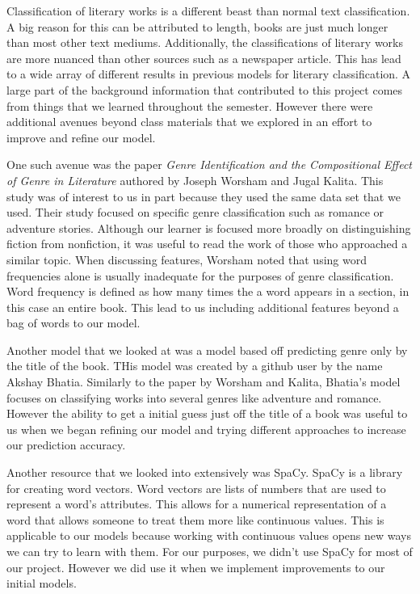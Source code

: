 \documentclass{article}
\begin{document}
Classification of literary works is a different beast than normal text classification. A big reason for this can be attributed to length, books are just much longer than most other text mediums. Additionally, the classifications of literary works are more nuanced than other sources such as a newspaper article. This has lead to a wide array of different results in previous models for literary classification. A large part of the background information that contributed to this project comes from things that we learned throughout the semester. However there were additional avenues beyond class materials that we explored in an effort to improve and refine our model. \par
One such avenue was the paper \textit{Genre Identification and the Compositional Effect of Genre in Literature} authored by Joseph Worsham and Jugal Kalita. This study was of interest to us in part because they used the same data set that we used. Their study focused on specific genre classification such as romance or adventure stories. Although our learner is focused more broadly on distinguishing fiction from nonfiction, it was useful to read the work of those who approached a similar topic. When discussing features, Worsham noted that using word frequencies alone is usually inadequate for the purposes of genre classification. Word frequency is defined as how many times the a word appears in a section, in this case an entire book. This lead to us including additional features beyond a bag of words to our model. \par
Another model that we looked at was a model based off predicting genre only by the title of the book. THis model was created by a github user by the name Akshay Bhatia. Similarly to the paper by Worsham and Kalita, Bhatia’s model focuses on classifying works into several genres like adventure and romance. However the ability to get a initial guess just off the title of a book was useful to us when we began refining our model and trying different approaches to increase our prediction accuracy.\par
Another resource that we looked into extensively was SpaCy. SpaCy is a library for creating word vectors. Word vectors are lists of numbers that are used to represent a word’s attributes. This allows for a numerical representation of a word that allows someone to treat them more like continuous values. This is applicable to our models because working with continuous values opens new ways we can try to learn with them. For our purposes, we didn’t use SpaCy for most of our project. However we did use it when we implement improvements to our initial models.
\end{document}
